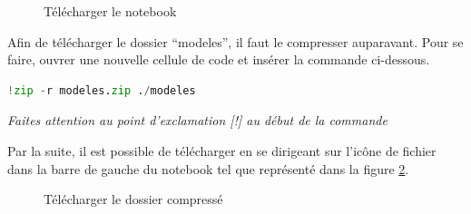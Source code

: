 \documentclass{article}
\begin{document}
\begin{figure}[H]
  \centering
  \caption{Télécharger le notebook}
  \label{fig:downloadipynb}
\end{figure}
\medbreak
Afin de télécharger le dossier ``modeles'', il faut le compresser auparavant. Pour se faire, ouvrer une nouvelle cellule de code et insérer la commande ci-dessous.

\begin{lstlisting}[language=Python, caption={Compresser un fichier sur une session}, label={code:zip}]
!zip -r modeles.zip ./modeles
\end{lstlisting}
\smallbreak
\textit{Faites attention au point d'exclamation [!] au début de la commande}

\medbreak
Par la suite, il est possible de télécharger en se dirigeant sur l'icône de fichier dans la barre de gauche du notebook tel que représenté dans la figure \ref{fig:downloadzip}.
\begin{figure}[H]
  \centering
  \caption{Télécharger le dossier compressé}
  \label{fig:downloadzip}
\end{figure}
\end{document}
